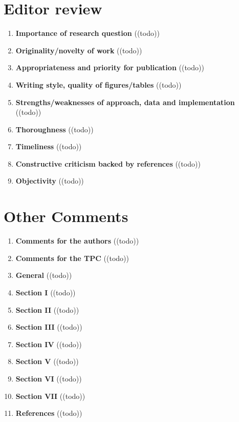 \section{Editor review}\label{sec:editorreview}
\begin{enumerate}[resume]
    \item \textbf{Importance of research question} 	\textcolor{HighlightColor}{((todo))}
    \item \textbf{Originality/novelty of work} 	\textcolor{HighlightColor}{((todo))}
    \item \textbf{Appropriateness and priority for publication} 	\textcolor{HighlightColor}{((todo))}
    \item \textbf{Writing style, quality of figures/tables} 	\textcolor{HighlightColor}{((todo))}
    \item \textbf{Strengths/weaknesses of approach, data and implementation} 	\textcolor{HighlightColor}{((todo))}
    \item \textbf{Thoroughness} 	\textcolor{HighlightColor}{((todo))}
    \item \textbf{Timeliness} 	\textcolor{HighlightColor}{((todo))}
    \item \textbf{Constructive criticism backed by references} \textcolor{HighlightColor}{((todo))}
    \item \textbf{Objectivity} 	\textcolor{HighlightColor}{((todo))}
\end{enumerate}

\section{Other Comments}\label{sec:other}
\begin{enumerate}[resume]
    \item \textbf{Comments for the authors} 	\textcolor{HighlightColor}{((todo))}
    \item \textbf{Comments for the TPC} 	\textcolor{HighlightColor}{((todo))}
    \item \textbf{General} 	\textcolor{HighlightColor}{((todo))}
    \item \textbf{Section I} 	\textcolor{HighlightColor}{((todo))}
    \item \textbf{Section II} 	\textcolor{HighlightColor}{((todo))}
    \item \textbf{Section III} 	\textcolor{HighlightColor}{((todo))}
    \item \textbf{Section IV} 	\textcolor{HighlightColor}{((todo))}
    \item \textbf{Section V} 	\textcolor{HighlightColor}{((todo))}
    \item \textbf{Section VI} 	\textcolor{HighlightColor}{((todo))}
    \item \textbf{Section VII} 	\textcolor{HighlightColor}{((todo))}
    \item \textbf{References} 	\textcolor{HighlightColor}{((todo))}
\end{enumerate}
